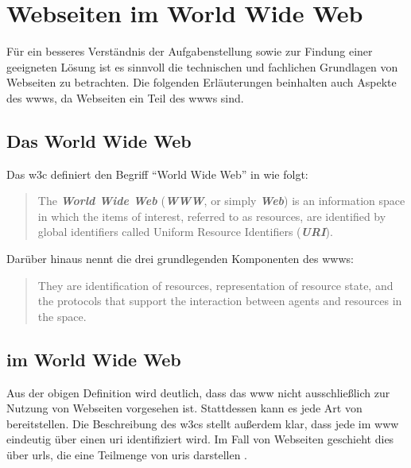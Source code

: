 \section{Webseiten im World Wide Web}
    \label{section:problemAnalysisWebpagesInTheWWW}
    Für ein besseres Verständnis der Aufgabenstellung sowie zur Findung
    einer geeigneten Lösung ist es sinnvoll die technischen und fachlichen
    Grundlagen von Webseiten zu betrachten.
    Die folgenden Erläuterungen beinhalten auch Aspekte des \glspl{www},
    da Webseiten ein Teil des \glspl{www} sind.

    \subsection{Das World Wide Web}
        Das \gls{w3c} definiert den Begriff "`World Wide Web"' in \cite{w3c:wwwArch} wie folgt:

        \begin{quote}
            The \textit{\textbf{World Wide Web}} (\textit{\textbf{WWW}}, or simply \textit{\textbf{Web}})
            is an information space in which the items of interest, referred to as resources,
            are identified by global identifiers called Uniform Resource Identifiers (\textit{\textbf{URI}}).
        \end{quote}

        Darüber hinaus nennt \cite{w3c:wwwArch} die drei grundlegenden Komponenten des \glspl{www}:

        \begin{quote}
            They are identification of resources,
            representation of resource state, and the protocols
            that support the interaction between agents and resources in the space.
        \end{quote}

    \subsection{{\resources} im World Wide Web}
        \label{section:problemAnalysisWebpagesInTheWWWResources}
        Aus der obigen Definition wird deutlich,
        dass das \gls{www} nicht ausschließlich zur Nutzung von Webseiten
        vorgesehen ist.
        Stattdessen kann es jede Art von {\resources} bereitstellen.
        Die Beschreibung des \glspl{w3c} stellt außerdem klar,
        dass jede {\resource} im \gls{www} eindeutig über einen \gls{uri} identifiziert wird.
        Im Fall von Webseiten geschieht dies über \glspl{url},
        die eine Teilmenge von \glspl{uri} darstellen
        \cite[Kapitel 1.1.3]{rfc:3986}.

